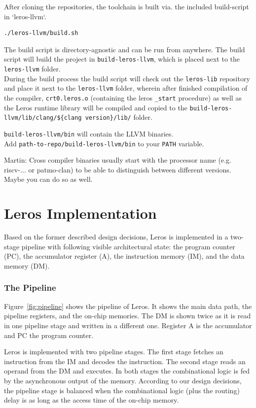 \documentclass[a4paper,fontsize=10pt,twoside,DIV15,BCOR12mm,headinclude=true,footinclude=false,pagesize,bibtotoc]{scrbook}
\newcommand{\code}[1]{{\small{\texttt{#1}}}}
\newcommand{\martin}[1]{{\color{blue} Martin: #1}}
\begin{document}
After cloning the repositories, the toolchain is built via. the included build-script in `leros-llvm`.
\begin{verbatim}
./leros-llvm/build.sh
\end{verbatim}
The build script is directory-agnostic and can be run from anywhere. The build script will build the project in \texttt{build-leros-llvm}, which is placed next to the \texttt{leros-llvm} folder.\\

During the build process the build script will check out the \texttt{leros-lib} repository and place it next to the \texttt{leros-llvm} folder, wherein after finished compilation of the compiler, \texttt{crt0.leros.o} (containing the leros \texttt{\_start} procedure) as well as the Leros runtime library will be compiled and copied to the \texttt{build-leros-llvm/lib/clang/\$\{clang version\}/lib/} folder.

\texttt{build-leros-llvm/bin} will contain the LLVM binaries.\\
Add \code{path-to-repo/build-leros-llvm/bin} to your \code{PATH} variable.

\martin{Cross compiler binaries usually start with the processor name (e.g. riscv-... or patmo-clan)
to be able to distinguish between different versions. Maybe you can do so as well.}

\chapter{Leros Implementation}
\label{sec:imp}

Based on the former described design decisions, Leros is implemented in a two-stage pipeline with following visible architectural state: the program counter (PC), the accumulator register (A), the instruction memory (IM), and the data memory (DM).

\subsection{The Pipeline}

Figure~\ref{fig:pipeline} shows the pipeline of Leros. It shows the main data path, the pipeline registers, and the on-chip memories. The DM is shown twice as it is read in one pipeline stage and written in a different one. Register A is the accumulator and PC the program counter.

Leros is implemented with two pipeline stages. The first stage fetches an instruction from the IM and decodes the instruction. The second stage reads an operand from the DM and executes. In both stages the combinational logic is fed by the asynchronous output of the memory. According to our design decisions, the pipeline stage is balanced when the combinational logic (plus the routing) delay is as long as the access time of the on-chip memory.
\end{document}
